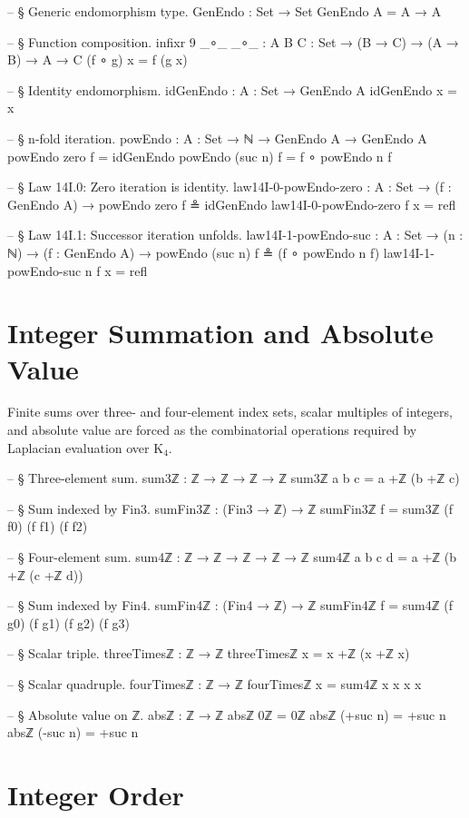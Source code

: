 \documentclass[11pt,a4paper]{book}
\begin{document}
\begin{code}
-- § Generic endomorphism type.
GenEndo : Set → Set
GenEndo A = A → A

-- § Function composition.
infixr 9 _∘_
_∘_ : {A B C : Set} → (B → C) → (A → B) → A → C
(f ∘ g) x = f (g x)

-- § Identity endomorphism.
idGenEndo : {A : Set} → GenEndo A
idGenEndo x = x

-- § n-fold iteration.
powEndo : {A : Set} → ℕ → GenEndo A → GenEndo A
powEndo zero    f = idGenEndo
powEndo (suc n) f = f ∘ powEndo n f

-- § Law 14I.0: Zero iteration is identity.
law14I-0-powEndo-zero : {A : Set} → (f : GenEndo A) → powEndo zero f ≗ idGenEndo
law14I-0-powEndo-zero f x = refl

-- § Law 14I.1: Successor iteration unfolds.
law14I-1-powEndo-suc : {A : Set} → (n : ℕ) → (f : GenEndo A) → powEndo (suc n) f ≗ (f ∘ powEndo n f)
law14I-1-powEndo-suc n f x = refl
\end{code}

\section{Integer Summation and Absolute Value}

Finite sums over three- and four-element index sets, scalar multiples of integers,
and absolute value are forced as the combinatorial operations required by Laplacian
evaluation over K$_4$.

\begin{code}
-- § Three-element sum.
sum3ℤ : ℤ → ℤ → ℤ → ℤ
sum3ℤ a b c = a +ℤ (b +ℤ c)

-- § Sum indexed by Fin3.
sumFin3ℤ : (Fin3 → ℤ) → ℤ
sumFin3ℤ f = sum3ℤ (f f0) (f f1) (f f2)

-- § Four-element sum.
sum4ℤ : ℤ → ℤ → ℤ → ℤ → ℤ
sum4ℤ a b c d = a +ℤ (b +ℤ (c +ℤ d))

-- § Sum indexed by Fin4.
sumFin4ℤ : (Fin4 → ℤ) → ℤ
sumFin4ℤ f = sum4ℤ (f g0) (f g1) (f g2) (f g3)

-- § Scalar triple.
threeTimesℤ : ℤ → ℤ
threeTimesℤ x = x +ℤ (x +ℤ x)

-- § Scalar quadruple.
fourTimesℤ : ℤ → ℤ
fourTimesℤ x = sum4ℤ x x x x

-- § Absolute value on ℤ.
absℤ : ℤ → ℤ
absℤ 0ℤ = 0ℤ
absℤ (+suc n) = +suc n
absℤ (-suc n) = +suc n
\end{code}

\section{Integer Order}
\end{document}
